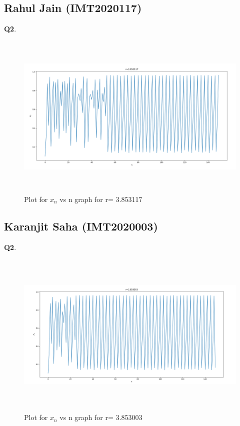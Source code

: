 \documentclass[11pt]{scrartcl} %
\begin{document}
\subsection{Rahul Jain (IMT2020117)}
\textbf{Q2}.
\begin{figure}[h] %
	\centering
	\includegraphics[width=12cm, height=8cm]{Rahul_singer.png} %
	\caption {Plot for $x_n$ vs n graph for r= 3.853117}
\end{figure}
\newpage
\subsection{Karanjit Saha (IMT2020003)}
\textbf{Q2}.
\begin{figure}[h] %
	\centering
	\includegraphics[width=12cm, height=8cm]{Karanjit.png} %
	\caption {Plot for $x_n$ vs n graph for r= 3.853003}
\end{figure}
\newpage
\end{document}
